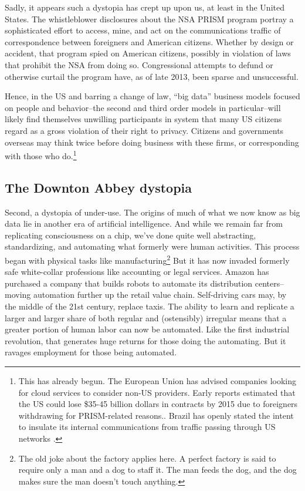 \documentclass[12pt]{article}
\begin{document}
Sadly, it appears such a dystopia has crept up upon us, at least in
the United States. The whistleblower disclosures about the NSA PRISM
program portray a sophisticated effort to access, mine, and act on the
communications traffic of correspondence between foreigners and
American citizens. Whether by design or accident, that program spied
on American citizens, possibly in violation of laws that prohibit the
NSA from doing so. Congressional attempts to defund or otherwise
curtail the program have, as of late 2013, been sparse and
unsuccessful.

Hence, in the US and barring a change of law, ``big data'' business
models focused on people and behavior--the second and third order
models in particular--will likely find themselves unwilling
participants in system that many US citizens regard as a gross
violation of their right to privacy. Citizens and governments overseas may think
twice before doing business with these firms, or corresponding with
those who do.\footnote{This has already begun. The European Union has
  advised companies looking for cloud services to consider non-US
  providers. Early reports estimated that the US could lose \$35-45
  billion dollars in contracts by 2015 due to foreigners withdrawing
  for PRISM-related reasons.\citep{babcock2013}. Brazil has openly
  stated the intent to insulate its internal communications from
  traffic passing through US networks \citep{bbc2013brazil}.} 

\subsection{The Downton Abbey dystopia}
\label{sec:downt-abbey-dyst}

Second, a dystopia of under-use. The origins of much of what we now
know as big data lie in another era of artificial intelligence. And
while we remain far from replicating consciousness on a chip, we've
done quite well abstracting, standardizing, and automating what
formerly were human activities. This process began with physical tasks
like manufacturing\footnote{The old joke about the factory applies
  here. A perfect factory is said to require only a man and a dog to
  staff it. The man feeds the dog, and the dog makes sure the man
  doesn't touch anything.} But it has now invaded formerly safe
white-collar professions like accounting or legal services. Amazon has
purchased a company that builds robots to automate its distribution
centers--moving automation further up the retail value
chain. Self-driving cars may, by the middle of the 21st century,
replace taxis. The ability to learn and replicate a larger
and larger share of both regular and (ostensibly) irregular means that
a greater portion of human labor can now be automated. Like the first
industrial revolution, that generates huge returns for those doing the
automating. But it ravages employment for those being automated. 
\end{document}
